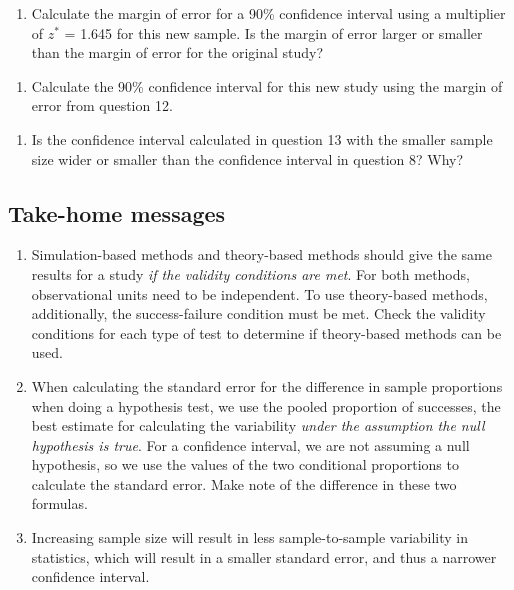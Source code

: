 \documentclass[
]{report}
\providecommand{\tightlist}{%
  \setlength{\itemsep}{0pt}\setlength{\parskip}{0pt}}
\begin{document}
\begin{enumerate}
\def\labelenumi{\arabic{enumi}.}
\setcounter{enumi}{11}
\tightlist
\item
  Calculate the margin of error for a 90\% confidence interval using a multiplier of \(z^*\) = 1.645 for this new sample. Is the margin of error larger or smaller than the margin of error for the original study?
\end{enumerate}

\vspace{.8in}

\begin{enumerate}
\def\labelenumi{\arabic{enumi}.}
\setcounter{enumi}{12}
\tightlist
\item
  Calculate the 90\% confidence interval for this new study using the margin of error from question 12.
\end{enumerate}

\vspace{.8in}

\begin{enumerate}
\def\labelenumi{\arabic{enumi}.}
\setcounter{enumi}{13}
\tightlist
\item
  Is the confidence interval calculated in question 13 with the smaller sample size wider or smaller than the confidence interval in question 8? Why?
\end{enumerate}

\vspace{.8in}

\hypertarget{take-home-messages-17}{%
\subsection{Take-home messages}\label{take-home-messages-17}}

\begin{enumerate}
\def\labelenumi{\arabic{enumi}.}
\item
  Simulation-based methods and theory-based methods should give the same results for a study \emph{if the validity conditions are met}. For both methods, observational units need to be independent. To use theory-based methods, additionally, the success-failure condition must be met. Check the validity conditions for each type of test to determine if theory-based methods can be used.
\item
  When calculating the standard error for the difference in sample proportions when doing a hypothesis test, we use the pooled proportion of successes, the best estimate for calculating the variability \emph{under the assumption the null hypothesis is true}. For a confidence interval, we are not assuming a null hypothesis, so we use the values of the two conditional proportions to calculate the standard error. Make note of the difference in these two formulas.
\item
  Increasing sample size will result in less sample-to-sample variability in statistics, which will result in a smaller standard error, and thus a narrower confidence interval.
\end{enumerate}
\end{document}
